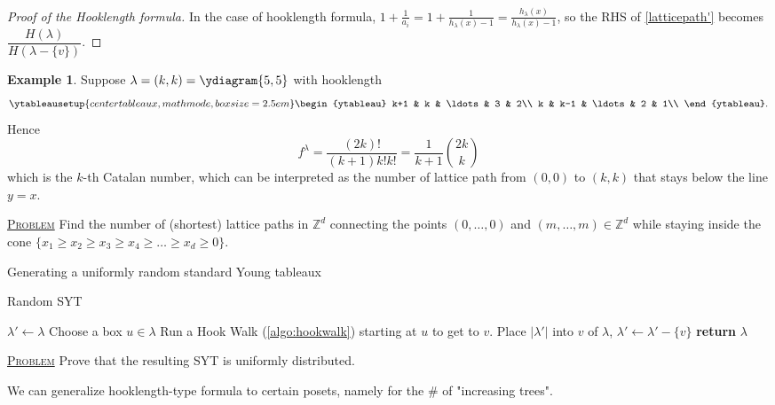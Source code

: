\documentclass{report}
\newcommand{\Z}{\mathbb{Z}}
\newcommand{\fancyem}[1]{\underline{\textsc{#1}}}
\theoremstyle{definition}
\newtheorem{example}{Example}[section]
\theoremstyle{remark}
\numberwithin{equation}{section}
\begin{document}
\begin{proof}[Proof of the Hooklength formula]
In the case of hooklength formula, $\displaystyle 1 + \frac{1}{a_i} = 1 + \frac{1}{h_\lambda(x) - 1} = \frac{h_\lambda(x)}{h_\lambda(x) - 1}$, so the RHS of \eqref{latticepath'} becomes $\dfrac{H(\lambda)}{H(\lambda - \{v\})}$.
\end{proof}

\begin{example}
    Suppose $\lambda = (k, k) = \ydiagram{5, 5}$ with hooklength \[
        \ytableausetup{centertableaux, mathmode, boxsize=2.5em}
        \begin{ytableau}
            k+1 & k & \ldots & 3 & 2\\
            k & k-1 & \ldots & 2 & 1\\
        \end{ytableau}.
    \] Hence \[
        f^{\lambda} = \frac{(2k)!}{(k+1)k!k!} = \frac{1}{k+1}\binom{2k}{k}
    \] which is the $k$-th Catalan number, which can be interpreted as the number of lattice path from $(0, 0)$ to $(k, k)$ that stays below the line $y = x$.
\end{example}

\fancyem{Problem} Find the number of (shortest) lattice paths in $\Z^d$ connecting the points $(0, \ldots, 0)$ and $(m, \ldots, m) \in \Z^d$ while staying inside the cone $\{x_1 \geq x_2 \geq x_3 \geq x_4 \geq \ldots \geq x_d \geq 0\}$.

Generating a uniformly random standard Young tableaux

\begin{algorithm}[h]
    \caption{Random SYT}
    \label{algo:unirandSYT}
    \begin{algorithmic}[1]
            \State $\lambda' \gets \lambda$
            \State Choose a box $u \in \lambda$
            \State Run a Hook Walk (\autoref{algo:hookwalk}) starting at $u$ to get to $v$.
            \State Place $|\lambda'|$ into $v$ of $\lambda$, $\lambda' \gets \lambda' - \{v\}$
            \EndWhile
            \State \textbf{return} $\lambda$
        \EndFunction
    \end{algorithmic}
\end{algorithm}
\fancyem{Problem} Prove that the resulting SYT is uniformly distributed.

We can generalize hooklength-type formula to certain posets, namely for the $\#$ of "increasing trees".
\end{document}
